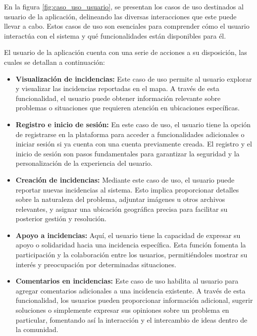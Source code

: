 \documentclass{article}
\begin{document}
En la figura \ref{fig:caso_uso_usuario}, se presentan los casos de uso destinados al usuario de la aplicación, delineando las diversas interacciones que este puede llevar a cabo. Estos casos de uso son esenciales para comprender cómo el usuario interactúa con el sistema y qué funcionalidades están disponibles para él.

El usuario de la aplicación cuenta con una serie de acciones a su disposición, las cuales se detallan a continuación:

\begin{itemize}
    \item \textbf{Visualización de incidencias:} Este caso de uso permite al usuario explorar y visualizar las incidencias reportadas en el mapa. A través de esta funcionalidad, el usuario puede obtener información relevante sobre problemas o situaciones que requieren atención en ubicaciones específicas.

    \item \textbf{Registro e inicio de sesión:} En este caso de uso, el usuario tiene la opción de registrarse en la plataforma para acceder a funcionalidades adicionales o iniciar sesión si ya cuenta con una cuenta previamente creada. El registro y el inicio de sesión son pasos fundamentales para garantizar la seguridad y la personalización de la experiencia del usuario.
    
    \item \textbf{Creación de incidencias:} Mediante este caso de uso, el usuario puede reportar nuevas incidencias al sistema. Esto implica proporcionar detalles sobre la naturaleza del problema, adjuntar imágenes u otros archivos relevantes, y asignar una ubicación geográfica precisa para facilitar su posterior gestión y resolución.
    
    \item \textbf{Apoyo a incidencias:} Aquí, el usuario tiene la capacidad de expresar su apoyo o solidaridad hacia una incidencia específica. Esta función fomenta la participación y la colaboración entre los usuarios, permitiéndoles mostrar su interés y preocupación por determinadas situaciones.
    
    \item \textbf{Comentarios en incidencias:} Este caso de uso habilita al usuario para agregar comentarios adicionales a una incidencia existente. A través de esta funcionalidad, los usuarios pueden proporcionar información adicional, sugerir soluciones o simplemente expresar sus opiniones sobre un problema en particular, fomentando así la interacción y el intercambio de ideas dentro de la comunidad.
\end{itemize}
\end{document}
